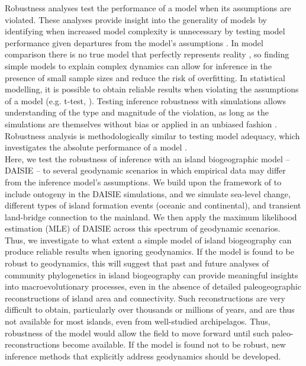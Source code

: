 \documentclass{article}
\begin{document}
Robustness analyses test the performance of a model when its assumptions are violated. These analyses provide insight into the generality of models by identifying when increased model complexity is unnecessary by testing model performance given departures from the model’s assumptions \citep{weisberg_robustness_2006, grimm_robustness_2016}. In model comparison there is no true model that perfectly represents reality \citep{burnham_model_2002}, so finding simple models to explain complex dynamics can allow for inference in the presence of small sample sizes and reduce the risk of overfitting. In statistical modelling, it is possible to obtain reliable results when violating the assumptions of a model (e.g. t-test, \cite{boneau_effects_1960}). Testing inference robustness with simulations allows understanding of the type and magnitude of the violation, as long as the simulations are themselves without bias or applied in an unbiased fashion \citep{huelsenbeck_performance_1995, hartmann_sampling_2010}. Robustness analysis is methodologically similar to testing model adequacy, which investigates the absolute performance of a model \citep{bollback_bayesian_2002, pennell_model_2015}. \\

Here, we test the robustness of inference with an island biogeographic model – DAISIE – to several geodynamic scenarios in which empirical data may differ from the inference model’s assumptions. We build upon the framework of \cite{valente_effects_2014} to include ontogeny in the DAISIE simulations, and we simulate sea-level change, different types of island formation events (oceanic and continental), and transient land-bridge connection to the mainland. We then apply the maximum likelihood estimation (MLE) of DAISIE across this spectrum of geodynamic scenarios. Thus, we investigate to what extent a simple model of island biogeography can produce reliable results when ignoring geodynamics. If the model is found to be robust to geodynamics, this will suggest that past and future analyses of community phylogenetics in island biogeography can provide meaningful insights into macroevolutionary processes, even in the absence of detailed paleogeographic reconstructions of island area and connectivity. Such reconstructions are very difficult to obtain, particularly over thousands or millions of years, and are thus not available for most islands, even from well-studied archipelagos. Thus, robustness of the model would allow the field to move forward until such paleo-reconstructions become available. If the model is found not to be robust, new inference methods that explicitly address geodynamics should be developed.
\end{document}
